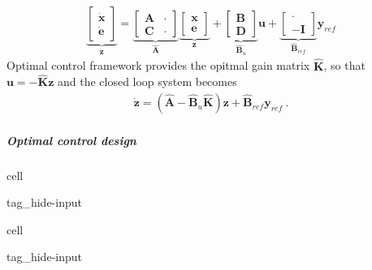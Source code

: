 \documentclass[letterpaper,10pt,english]{jupyterBook}
\begin{document}
\begin{equation*}
\begin{split}\underbrace{\begin{bmatrix} \dot{\mathbf{x}} \\ \dot{\mathbf{e}} \end{bmatrix}}_{\dot{\mathbf{z}}} = \underbrace{\begin{bmatrix} \mathbf{A} & \cdot \\ \mathbf{C} & \cdot \end{bmatrix}}_{\hat{\mathbf{A}}} \underbrace{\begin{bmatrix} \mathbf{x} \\ \mathbf{e} \end{bmatrix}}_{\mathbf{z}} + \underbrace{\begin{bmatrix} \mathbf{B} \\ \mathbf{D} \end{bmatrix}}_{\hat{\mathbf{B}}_u} \mathbf{u} + \underbrace{\begin{bmatrix} \cdot \\ -\mathbf{I} \end{bmatrix}}_{\hat{\mathbf{B}}_{ref}} \mathbf{y}_{ref}\end{split}
\end{equation*}
\sphinxAtStartPar
Optimal control framework provides the opitmal gain matrix \(\hat{\mathbf{K}}\), so that \(\mathbf{u} = - \hat{\mathbf{K}} \mathbf{z}\) and the closed loop system becomes
\begin{equation*}
\begin{split}\dot{\mathbf{z}} = \left( \hat{\mathbf{A}} - \hat{\mathbf{B}}_u \hat{\mathbf{K}} \right) \mathbf{z} + \hat{\mathbf{B}}_{ref} \mathbf{y}_{ref} \ .\end{split}
\end{equation*}

\subparagraph{Optimal control design}
\label{\detokenize{ch/control/optimal-control-ref-tracking-example:optimal-control-design}}
\begin{sphinxuseclass}{cell}
\begin{sphinxuseclass}{tag_hide-input}
\end{sphinxuseclass}
\end{sphinxuseclass}
\begin{sphinxuseclass}{cell}
\begin{sphinxuseclass}{tag_hide-input}
\end{sphinxuseclass}
\end{sphinxuseclass}
\end{document}
